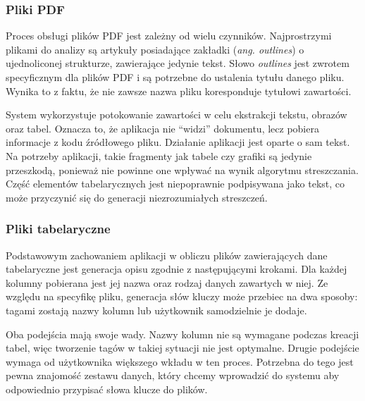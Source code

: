 \documentclass[12pt,a4paper,twoside]{article}
\begin{document}
\subsubsection*{Pliki PDF}
Proces obsługi plików PDF jest zależny od wielu czynników. Najprostrzymi plikami do analizy są artykuły posiadające zakładki (\textit{ang. outlines}) o ujednoliconej strukturze, zawierające jedynie tekst. Słowo \textit{outlines} jest zwrotem specyficznym dla plików PDF i są potrzebne do ustalenia tytułu danego pliku. Wynika to z faktu, że nie zawsze nazwa pliku koresponduje tytułowi zawartości.\par
System wykorzystuje potokowanie zawartości w celu ekstrakcji tekstu, obrazów oraz tabel. Oznacza to, że aplikacja nie ``widzi'' dokumentu, lecz pobiera informacje z kodu źródłowego pliku. Działanie aplikacji jest oparte o sam tekst. Na potrzeby aplikacji, takie fragmenty jak tabele czy grafiki są jedynie przeszkodą, ponieważ nie powinne one wpływać na wynik algorytmu streszczania. Część elementów tabelarycznych jest niepoprawnie podpisywana jako tekst, co może przyczynić się do generacji niezrozumiałych streszczeń. 
\subsubsection*{Pliki tabelaryczne}
Podstawowym zachowaniem aplikacji w obliczu plików zawierających dane tabelaryczne jest generacja opisu zgodnie z następującymi krokami. Dla każdej kolumny pobierana jest jej nazwa oraz rodzaj danych zawartych w niej. Ze względu na specyfikę pliku, generacja słów kluczy może przebiec na dwa sposoby: tagami zostają nazwy kolumn lub użytkownik samodzielnie je dodaje.\par
Oba podejścia mają swoje wady. Nazwy kolumn nie są wymagane podczas kreacji tabel, więc tworzenie tagów w takiej sytuacji nie jest optymalne. Drugie podejście wymaga od użytkownika większego wkładu w ten proces. Potrzebna do tego jest pewna znajomość zestawu danych, który chcemy wprowadzić do systemu aby odpowiednio przypisać słowa klucze do plików.
\end{document}
